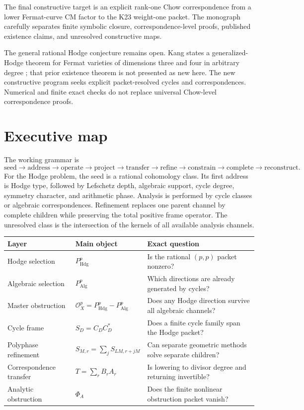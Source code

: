 \documentclass[11pt,oneside]{book}
\theoremstyle{definition}
\theoremstyle{remark}
\newcommand{\Hdg}{\operatorname{Hdg}}
\newcommand{\Alg}{\operatorname{Alg}}
\begin{document}
The final constructive target is an explicit rank-one Chow correspondence from a lower Fermat-curve CM factor to the K23 weight-one packet. The monograph carefully separates finite symbolic closure, correspondence-level proofs, published existence claims, and unresolved constructive maps.

\begin{claimboundary}
The general rational Hodge conjecture remains open. Kang states a generalized-Hodge theorem for Fermat varieties of dimensions three and four in arbitrary degree \cite{KangFermat}; that prior existence theorem is not presented as new here. The new constructive program seeks explicit packet-resolved cycles and correspondences. Numerical and finite exact checks do not replace universal Chow-level correspondence proofs.
\end{claimboundary}

\chapter*{Executive map}
The working grammar is
\[
\text{seed}\to\text{address}\to\text{operate}\to\text{project}
\to\text{transfer}\to\text{refine}\to\text{constrain}
\to\text{complete}\to\text{reconstruct}.
\]
For the Hodge problem, the seed is a rational cohomology class. Its first address is Hodge type, followed by Lefschetz depth, algebraic support, cycle degree, symmetry character, and arithmetic phase. Analysis is performed by cycle classes or algebraic correspondences. Refinement replaces one parent channel by complete children while preserving the total positive frame operator. The unresolved class is the intersection of the kernels of all available analysis channels.

\begin{center}
\begin{tabular}{p{}p{}p{}}
\toprule
Layer & Main object & Exact question \\
\midrule
Hodge selection & $P_{\Hdg}^p$ & Is the rational $(p,p)$ packet nonzero? \\
Algebraic selection & $P_{\Alg}^p$ & Which directions are already generated by cycles? \\
Master obstruction & $\mathcal O_X^p=P_{\Hdg}^p-P_{\Alg}^p$ & Does any Hodge direction survive all algebraic channels? \\
Cycle frame & $S_D=C_DC_D^*$ & Does a finite cycle family span the Hodge packet? \\
Polyphase refinement & $S_{M,r}=\sum_j S_{LM,r+jM}$ & Can separate geometric methods solve separate children? \\
Correspondence transfer & $T=\sum_rB_rA_r$ & Is lowering to divisor degree and returning invertible? \\
Analytic obstruction & $\Phi_A$ & Does the finite nonlinear obstruction packet vanish? \\
\bottomrule
\end{tabular}
\end{center}
\end{document}

